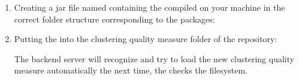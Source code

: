 \begin{enumerate}
			\item Creating a jar file named  containing the  compiled on your machine in the correct folder structure corresponding to the packages:
			
			
			\item Putting the  into the clustering quality measure folder of the repository:
			
			\highlight{\reposuppqualmeasures}
			
			The backend server will recognize and try to load the new clustering quality measure automatically the next time, the  checks the filesystem.
		\end{enumerate}

